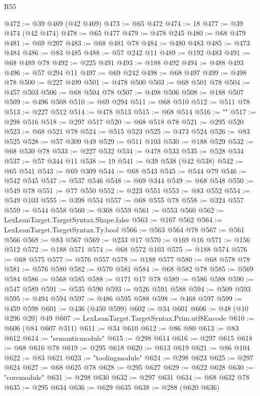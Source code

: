 \begin{lexlean}{R55}
\begin{coremodule}
{{{{{{{{{{{{{{{{{{{{{{{{{{{{{{{{{{{{{{{{{{{{{{{{{{{{{{{{{{{{{@472 := @39 @469 (@42 @469)
@473 := @65 @472
@474 := 18
@477 := @39 @474 (@42 @474)
@478 := @65 @477
@479 := @478 @245
@480 := @68 @479
@481 := @69 @207
@483 := @68 @481 @78
@484 := @480 @483
@485 := @473 @484
@486 := @83 @485
@488 := @57 @242 @11
@489 := @192 @483
@491 := @68 @489 @78
@492 := @225 @491
@493 := @188 @492
@494 := @488 @493
@496 := @57 @294 @11
@497 := @69 @242
@498 := @68 @497
@499 := @498 @78
@500 := @227 @499
@501 := @478 @500
@503 := @68 @501 @78
@504 := @457 @503
@506 := @68 @504 @78
@507 := @498 @506
@508 := @188 @507
@509 := @496 @508
@510 := @69 @294
@511 := @68 @510
@512 := @511 @78
@513 := @227 @512
@514 := @478 @513
@515 := @68 @514
@516 := "{"
@517 := @298 @516
@518 := @297 @517
@520 := @68 @518 @78
@521 := @295 @520
@523 := @68 @521 @78
@524 := @515 @523
@525 := @473 @524
@526 := @83 @525
@528 := @57 @309 @49
@529 := @511 @103
@530 := @188 @529
@532 := @68 @530 @78
@533 := @227 @532
@534 := @478 @533
@535 := @528 @534
@537 := @57 @344 @11
@538 := 19
@541 := @39 @538 (@42 @538)
@542 := @65 @541
@543 := @69 @309
@544 := @68 @543
@545 := @544 @79
@546 := @542 @545
@547 := @537 @546
@548 := @69 @344
@549 := @68 @548
@550 := @549 @78
@551 := @77 @550
@552 := @223 @551
@553 := @83 @552
@554 := @549 @103
@555 := @398 @554
@557 := @68 @555 @78
@558 := @324 @557
@559 := @544 @558
@560 := @368 @559
@561 := @553 @560
@562 := LexLeanTarget.TargetSyntax.Shape.false
@563 := @167 @562
@564 := LexLeanTarget.TargetSyntax.Ty.bool
@566 := @563 @564 @78
@567 := @561 @566
@568 := @83 @567
@569 := @233 @17
@570 := @169 @16
@571 := @156 @512
@572 := @188 @571
@574 := @68 @572 @103
@575 := @188 @574
@576 := @68 @575
@577 := @576 @557
@578 := @188 @577
@580 := @68 @578 @78
@581 := @576 @580
@582 := @570 @581
@584 := @68 @582 @78
@585 := @569 @584
@586 := @568 @585
@588 := @171 @17 @78
@589 := @586 @588
@590 := @547 @589
@591 := @535 @590
@593 := @526 @591 @588
@594 := @509 @593
@595 := @494 @594
@597 := @486 @595 @588
@598 := @468 @597
@599 := @459 @598
@601 := @436 (@450 @599)
@602 := @34 @601
@606 := @48 (@10 @296 @20) @49
@607 := LexLeanTarget.TargetSyntax.Prim.utf8Encode
@610 := @606 (@84 @607 @311)
@611 := @34 @610
@612 := @86 @80
@613 := @83 @612
@614 := "semanticmodule"
@615 := @298 @614
@616 := @297 @615
@618 := @68 @616 @78
@619 := @295 @618
@620 := @613 @619
@621 := @86 @104
@622 := @83 @621
@623 := "toolingmodule"
@624 := @298 @623
@625 := @297 @624
@627 := @68 @625 @78
@628 := @295 @627
@629 := @622 @628
@630 := "coremodule"
@631 := @298 @630
@632 := @297 @631
@634 := @68 @632 @78
@635 := @295 @634
@636 := @629 @635
@638 := @288 (@620 @636)
}}}}}}}}}}}}}}}}}}}}}}}}}}}}}}}}}}}}}}}}}}}}}}}}}}}}}}}}}}}}}}
\end{coremodule}
\end{lexlean}
